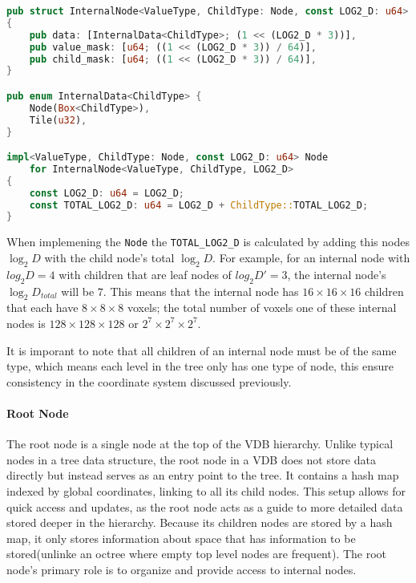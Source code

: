 \begin{lstlisting}[language=rust, captionpos=b, caption={
    \texttt{InternalNode} definition. Internal nodes have an extra field, the child mask that is the same size of the value mask.
    Aditionally the internal data enum now has variants for a child pointer or 4 bytes of memory.
}]
pub struct InternalNode<ValueType, ChildType: Node, const LOG2_D: u64>
{
    pub data: [InternalData<ChildType>; (1 << (LOG2_D * 3))],
    pub value_mask: [u64; ((1 << (LOG2_D * 3)) / 64)],
    pub child_mask: [u64; ((1 << (LOG2_D * 3)) / 64)],
}

pub enum InternalData<ChildType> {
    Node(Box<ChildType>),
    Tile(u32),
}

impl<ValueType, ChildType: Node, const LOG2_D: u64> Node
    for InternalNode<ValueType, ChildType, LOG2_D>
{
    const LOG2_D: u64 = LOG2_D;
    const TOTAL_LOG2_D: u64 = LOG2_D + ChildType::TOTAL_LOG2_D;
}
\end{lstlisting}

When implemening the \verb|Node| the \verb|TOTAL_LOG2_D| is calculated by adding this nodes $\log_{2}D$ with the child node's total $\log_{2}D$.
For example, for an internal node with $log_{2}D = 4$ with children that are leaf nodes of $log_{2}D' = 3$, the internal node's $\log_{2}D_{{total}}$ will be $7$. This means that the internal node has $16\times16\times16$  children that each have $8\times8\times8$ voxels; the total number of voxels one of these internal nodes is $128\times128\times128$ or $2^{7}\times2^{7}\times2^{7}$.

It is imporant to note that all children of an internal node must be of the same type, which means each level in the tree only has one type of node, this ensure consistency in the coordinate system discussed previously.

\paragraph{Root Node} The root node is a single node at the top of the VDB hierarchy. Unlike typical nodes in a tree data structure, the root node in a VDB does not store data directly but instead serves as an entry point to the tree.
It contains a hash map indexed by global coordinates, linking to all its child nodes. This setup allows for quick access and updates, as the root node acts as a guide to more detailed data stored deeper in the hierarchy. Because its children nodes are stored by a hash map, it only stores information about space that has information to be stored(unlinke an octree where empty top level nodes are frequent). The root node's primary role is to organize and provide access to internal nodes.



